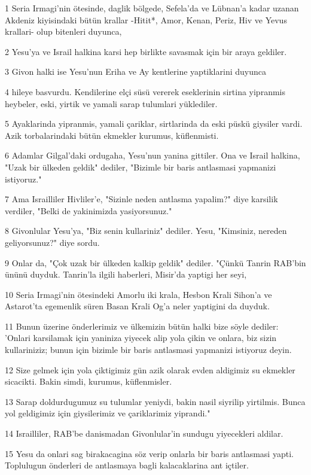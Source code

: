 \par 1 Seria Irmagi'nin ötesinde, daglik bölgede, Sefela'da ve Lübnan'a kadar uzanan Akdeniz kiyisindaki bütün krallar -Hitit*, Amor, Kenan, Periz, Hiv ve Yevus krallari- olup bitenleri duyunca,
\par 2 Yesu'ya ve Israil halkina karsi hep birlikte savasmak için bir araya geldiler.
\par 3 Givon halki ise Yesu'nun Eriha ve Ay kentlerine yaptiklarini duyunca
\par 4 hileye basvurdu. Kendilerine elçi süsü vererek eseklerinin sirtina yipranmis heybeler, eski, yirtik ve yamali sarap tulumlari yüklediler.
\par 5 Ayaklarinda yipranmis, yamali çariklar, sirtlarinda da eski püskü giysiler vardi. Azik torbalarindaki bütün ekmekler kurumus, küflenmisti.
\par 6 Adamlar Gilgal'daki ordugaha, Yesu'nun yanina gittiler. Ona ve Israil halkina, "Uzak bir ülkeden geldik" dediler, "Bizimle bir baris antlasmasi yapmanizi istiyoruz."
\par 7 Ama Israilliler Hivliler'e, "Sizinle neden antlasma yapalim?" diye karsilik verdiler, "Belki de yakinimizda yasiyorsunuz."
\par 8 Givonlular Yesu'ya, "Biz senin kullariniz" dediler. Yesu, "Kimsiniz, nereden geliyorsunuz?" diye sordu.
\par 9 Onlar da, "Çok uzak bir ülkeden kalkip geldik" dediler. "Çünkü Tanrin RAB'bin ününü duyduk. Tanrin'la ilgili haberleri, Misir'da yaptigi her seyi,
\par 10 Seria Irmagi'nin ötesindeki Amorlu iki krala, Hesbon Krali Sihon'a ve Astarot'ta egemenlik süren Basan Krali Og'a neler yaptigini da duyduk.
\par 11 Bunun üzerine önderlerimiz ve ülkemizin bütün halki bize söyle dediler: 'Onlari karsilamak için yaniniza yiyecek alip yola çikin ve onlara, biz sizin kullariniziz; bunun için bizimle bir baris antlasmasi yapmanizi istiyoruz deyin.
\par 12 Size gelmek için yola çiktigimiz gün azik olarak evden aldigimiz su ekmekler sicacikti. Bakin simdi, kurumus, küflenmisler.
\par 13 Sarap doldurdugumuz su tulumlar yeniydi, bakin nasil siyrilip yirtilmis. Bunca yol geldigimiz için giysilerimiz ve çariklarimiz yiprandi."
\par 14 Israilliler, RAB'be danismadan Givonlular'in sundugu yiyecekleri aldilar.
\par 15 Yesu da onlari sag birakacagina söz verip onlarla bir baris antlasmasi yapti. Toplulugun önderleri de antlasmaya bagli kalacaklarina ant içtiler.
